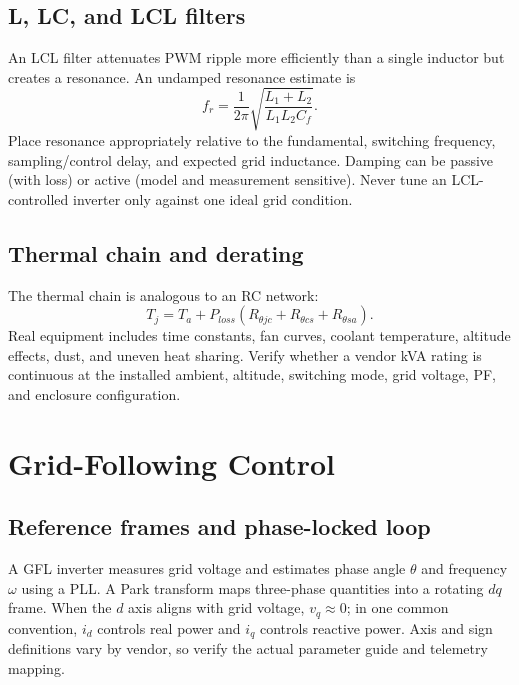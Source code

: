 \documentclass[11pt]{article}
\begin{document}
\subsection{L, LC, and LCL filters}
An LCL filter attenuates PWM ripple more efficiently than a single inductor but
creates a resonance. An undamped resonance estimate is
\[
f_r=\frac{1}{2\pi}\sqrt{\frac{L_1+L_2}{L_1L_2C_f}}.
\]
Place resonance appropriately relative to the fundamental, switching frequency,
sampling/control delay, and expected grid inductance. Damping can be passive
(with loss) or active (model and measurement sensitive). Never tune an
LCL-controlled inverter only against one ideal grid condition.

\subsection{Thermal chain and derating}
The thermal chain is analogous to an RC network:
\[
T_j=T_a+P_{loss}(R_{\theta jc}+R_{\theta cs}+R_{\theta sa}).
\]
Real equipment includes time constants, fan curves, coolant temperature,
altitude effects, dust, and uneven heat sharing. Verify whether a vendor kVA
rating is continuous at the installed ambient, altitude, switching mode, grid
voltage, PF, and enclosure configuration.

\section{Grid-Following Control}

\subsection{Reference frames and phase-locked loop}
A GFL inverter measures grid voltage and estimates phase angle $\theta$ and
frequency $\omega$ using a PLL. A Park transform maps three-phase quantities
into a rotating $dq$ frame. When the $d$ axis aligns with grid voltage,
$v_q\approx0$; in one common convention, $i_d$ controls real power and $i_q$
controls reactive power. Axis and sign definitions vary by vendor, so verify
the actual parameter guide and telemetry mapping.
\end{document}
